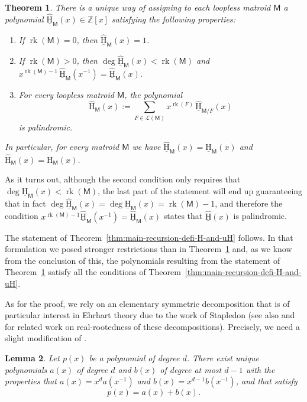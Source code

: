 \documentclass[11pt, a4paper, english]{amsart}
\theoremstyle{teoremas}
\newtheorem{theorem}{Theorem}[section]
\newtheorem{lemma}[theorem]{Lemma}
\theoremstyle{definition}
\DeclareMathOperator{\rk}{rk}
\newcommand{\M}{\mathsf{M}}
\newcommand{\Z}{\mathbb{Z}}
\renewcommand{\H}{\mathrm{H}}
\newcommand{\uH}{\underline{\mathrm{H}}}
\begin{document}
\begin{theorem}\label{thm:intrinsic-main-body}
    There is a unique way of assigning to each loopless matroid $\M$ a polynomial $\widehat{\uH}_{\M}(x) \in \Z[x]$ satisfying the following properties:
    \begin{enumerate}[\normalfont(i)]
        \item If $\rk(\M) = 0$, then $\widehat{\uH}_\M(x) = 1$. 
        \item If $\rk(\M) > 0$, then $\deg \widehat{\uH}_{\M}(x) < \rk(\M)$ and $x^{\rk(\M)-1}\, \widehat{\uH}_{\M}(x^{-1})=\widehat{\uH}_{\M}(x)$.
        \item For every loopless matroid $\M$, the polynomial
            \[ \widehat{\H}_{\M}(x) := \sum_{F\in\mathcal{L}(\M)} x^{\rk(F)}\, \widehat{\uH}_{\M/F}(x)\]
        is palindromic.
    \end{enumerate} 
    In particular, for every matroid $\M$ we have $\widehat{\uH}_{\M}(x) = \uH_{\M}(x)$ and $\widehat{\H}_{\M}(x) = \H_{\M}(x)$.
\end{theorem}

As it turns out, although the second condition only requires that $\deg \widehat{\uH}_{\M}(x) < \rk(\M)$, the last part of the statement will end up guaranteeing that in fact $\deg \widehat{\uH}_{\M}(x) = \deg \uH_{\M}(x) = \rk(\M) - 1$, and therefore the condition $x^{\rk(\M)-1}\widehat{\uH}_{\M}(x^{-1})=\widehat{\uH}_{\M}(x)$ states that $\widehat{\uH}(x)$ is palindromic.  

The statement of Theorem~\ref{thm:main-recursion-defi-H-and-uH} follows. In that formulation we posed stronger restrictions than in Theorem~\ref{thm:intrinsic-main-body} and, as we know from the conclusion of this, the polynomials resulting from the statement of Theorem~\ref{thm:intrinsic-main-body} satisfy all the conditions of Theorem~\ref{thm:main-recursion-defi-H-and-uH}.

As for the proof, we rely on an elementary symmetric decomposition that is of particular interest in Ehrhart theory due to the work of Stapledon (see also \cite{branden-solus} and \cite{athanasiadis-tzanaki} for related work on real-rootedness of these decompositions). Precisely, we need a slight modification of \cite[Lemma~2.3]{stapledon}.


\begin{lemma}\label{lemma:stapledon2}
    Let $p(x)$ be a polynomial of degree $d$. There exist unique polynomials $a(x)$ of degree $d$ and $b(x)$ of degree at most $d-1$ with the properties that $a(x) = x^d a(x^{-1})$ and $b(x)=x^{d-1} b(x^{-1})$, and that satisfy
        \[ p(x) = a(x) + b(x).\]
\end{lemma}
\end{document}
